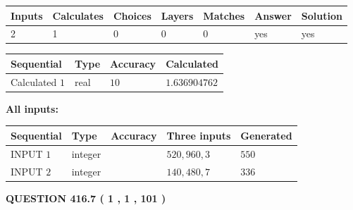 \documentclass{ctexart}
\begin{document}
 
\noindent{}
 
 

 
   
   
   
   
\noindent\begin{tabular}{|l|l|l|l|l|l|l|}
 \hline
Inputs & Calculates & Choices & Layers & Matches & Answer & Solution \\ \hline
 2  & 
 1  & 
 0
  & 
 0  & 
 0  & 
  yes & 
  yes 
  \\ \hline
 \end{tabular}
   
   
   
   
\noindent{}
   
   
  
  
\noindent\begin{tabular}{|l|l|l|l|}
\hline
 Sequential & Type & Accuracy & Calculated \\ 
\hline
 
 
  Calculated $  1 $ & real & $  10  $ & 
 $ 1.636904762 $ 
 \\  \hline  
 \end{tabular}
   
   
   
   
\noindent\vspace{0.1in}\hspace{-0.08in} {\textbf{\Large{All inputs: }}}
   
   
  
  
\noindent\begin{tabular}{|l|l|l|l|l|}
\hline
 Sequential & Type & Accuracy & Three inputs & Generated \\ 
\hline
 
 
  INPUT $  1 $ & integer &  & $
 520
 , 
 960
 , 
 3
 $ & $ 550 $ 
 \\  \hline  
 
 
  INPUT $  2 $ & integer &  & $
 140
 , 
 480
 , 
 7
 $ & $ 336 $ 
 \\  \hline  
 \end{tabular}
   
   
  
\vspace{0.2in}
  
{\textbf{\Large{QUESTION
416.7 
 ( 1 , 1 , 101 )
}}}
  
  
 
\end{document}
